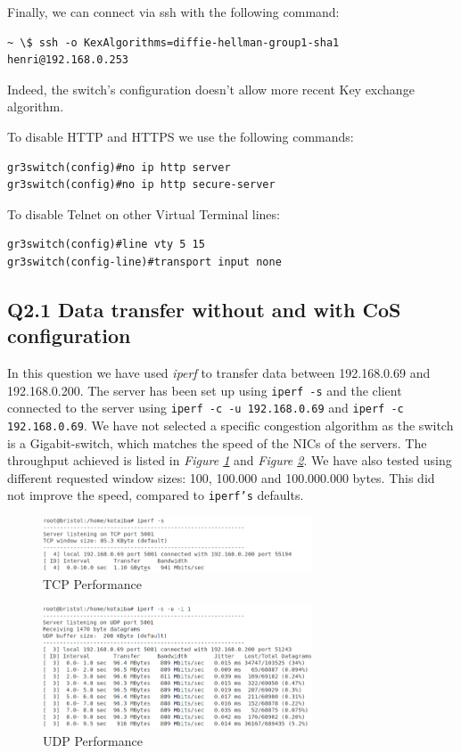\documentclass{article}
\begin{document}
Finally, we can connect via ssh with the following command:
\begin{verbatim}
~ \$ ssh -o KexAlgorithms=diffie-hellman-group1-sha1  henri@192.168.0.253    
\end{verbatim}

Indeed, the switch's configuration doesn't allow more recent Key exchange algorithm.

To disable HTTP and HTTPS we use the following commands:
\begin{verbatim}
gr3switch(config)#no ip http server
gr3switch(config)#no ip http secure-server
\end{verbatim}


To disable Telnet on other Virtual Terminal lines:
\begin{verbatim}
gr3switch(config)#line vty 5 15
gr3switch(config-line)#transport input none
\end{verbatim}

\subsection{Q2.1 Data transfer without and with CoS configuration}
In this question we have used \textit{iperf} to transfer data between 192.168.0.69 and 192.168.0.200. The server has been set up using \texttt{iperf -s} and the client connected to the server using \texttt{iperf -c -u 192.168.0.69} and \texttt{iperf -c 192.168.0.69}. We have not selected a specific congestion algorithm as the switch is a Gigabit-switch, which matches the speed of the NICs of the servers. The throughput achieved is listed in \textit{Figure \ref{fig:throughput_iperf}} and \textit{Figure \ref{fig:throughput_iperf2}}. We have also tested using different requested window sizes: 100, 100.000 and 100.000.000 bytes. This did not improve the speed, compared to \texttt{iperf's} defaults.

\bigskip

\begin{figure}[h]
\includegraphics[width=8cm]{figures/q2-1-1.png}
\centering
\caption{TCP Performance}
\centering
\label{fig:throughput_iperf}
\end{figure}



\bigskip

\begin{figure}[h]
\includegraphics[width=8cm]{figures/q2-1-2.png}
\centering
\caption{UDP Performance}
\centering
\label{fig:throughput_iperf2}
\end{figure}
\end{document}
